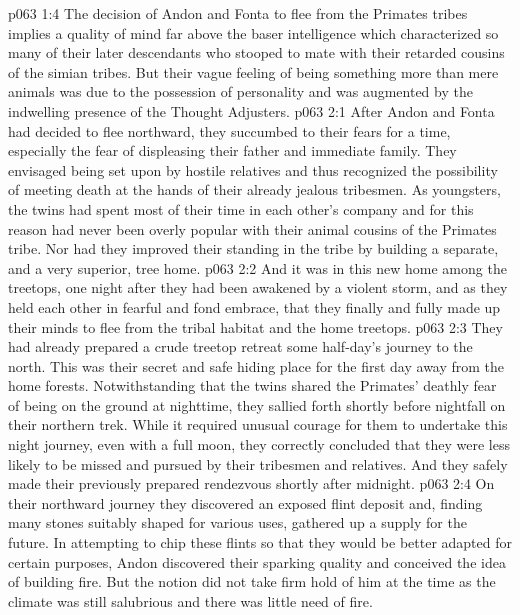 \vs p063 1:4 The decision of Andon and Fonta to flee from the Primates tribes implies a quality of mind far above the baser intelligence which characterized so many of their later descendants who stooped to mate with their retarded cousins of the simian tribes. But their vague feeling of being something more than mere animals was due to the possession of personality and was augmented by the indwelling presence of the Thought Adjusters.
\vs p063 2:1 After Andon and Fonta had decided to flee northward, they succumbed to their fears for a time, especially the fear of displeasing their father and immediate family. They envisaged being set upon by hostile relatives and thus recognized the possibility of meeting death at the hands of their already jealous tribesmen. As youngsters, the twins had spent most of their time in each other’s company and for this reason had never been overly popular with their animal cousins of the Primates tribe. Nor had they improved their standing in the tribe by building a separate, and a very superior, tree home.
\vs p063 2:2 And it was in this new home among the treetops, one night after they had been awakened by a violent storm, and as they held each other in fearful and fond embrace, that they finally and fully made up their minds to flee from the tribal habitat and the home treetops.
\vs p063 2:3 They had already prepared a crude treetop retreat some half\hyp{}day’s journey to the north. This was their secret and safe hiding place for the first day away from the home forests. Notwithstanding that the twins shared the Primates’ deathly fear of being on the ground at nighttime, they sallied forth shortly before nightfall on their northern trek. While it required unusual courage for them to undertake this night journey, even with a full moon, they correctly concluded that they were less likely to be missed and pursued by their tribesmen and relatives. And they safely made their previously prepared rendezvous shortly after midnight.
\vs p063 2:4 On their northward journey they discovered an exposed flint deposit and, finding many stones suitably shaped for various uses, gathered up a supply for the future. In attempting to chip these flints so that they would be better adapted for certain purposes, Andon discovered their sparking quality and conceived the idea of building fire. But the notion did not take firm hold of him at the time as the climate was still salubrious and there was little need of fire.
